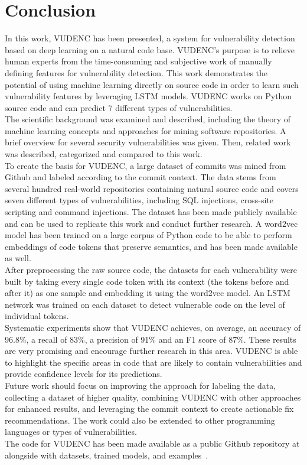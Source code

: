 \documentclass[
a4paper,
pagesize,
pdftex,
12pt,
ngerman,
fleqn,
final,
]{scrartcl}
\begin{document}
	\newpage
	\setcounter{secnumdepth}{0} %
	\section{Conclusion}
	In this work, VUDENC has been presented, a system for vulnerability detection based on deep learning on a natural code base. VUDENC's purpose is to relieve human experts from the time-consuming and subjective work of manually defining features for vulnerability detection. This work demonstrates the potential of using machine learning directly on source code in order to learn such vulnerability features by leveraging LSTM models. VUDENC works on Python source code and can predict 7 different types of vulnerabilities.\\
	The scientific background was examined and described, including the theory of machine learning concepts and approaches for mining software repositories. A brief overview for several security vulnerabilities was given. Then, related work was described, categorized and compared to this work.\\
	To create the basis for VUDENC, a large dataset of commits was mined from Github and labeled according to the commit context. The data stems from several hundred real-world repositories containing natural source code and covers seven different types of vulnerabilities, including SQL injections, cross-site scripting and command injections. The dataset has been made publicly available and can be used to replicate this work and conduct further research. A word2vec model has been trained on a large corpus of Python code to be able to perform embeddings of code tokens that preserve semantics, and has been made available as well.\\
	After preprocessing the raw source code, the datasets for each vulnerability were built by taking every single code token with its context (the tokens before and after it) as one sample and embedding it using the word2vec model. An LSTM network was trained on each dataset to detect vulnerable code on the level of individual tokens.\\
	Systematic experiments show that VUDENC achieves, on average, an accuracy of 96.8\%, a recall of 83\%, a precision of 91\% and an F1 score of 87\%. These results are very promising and encourage further research in this area. VUDENC is able to highlight the specific areas in code that are likely to contain vulnerabilities and provide confidence levels for its predictions.\\
	Future work should focus on improving the approach for labeling the data, collecting a dataset of higher quality, combining VUDENC with other approaches for enhanced results, and leveraging the commit context to create actionable fix recommendations. The work could also be extended to other programming languages or types of vulnerabilities.\\
	The code for VUDENC has been made available as a public Github repository at alongside with datasets, trained models, and examples~\cite{Wartschinski.2.12.2019}.
		
\end{document}
